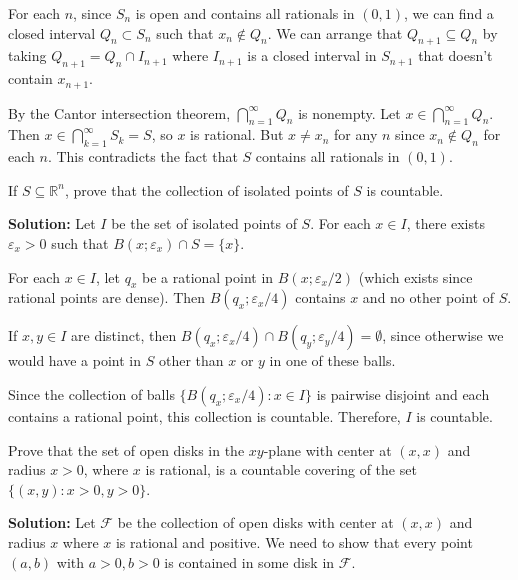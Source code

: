 For each $n$, since $S_n$ is open and contains all rationals in $(0,1)$, we can find a closed interval $Q_n \subset S_n$ such that $x_n \notin Q_n$. We can arrange that $Q_{n+1} \subseteq Q_n$ by taking $Q_{n+1} = Q_n \cap I_{n+1}$ where $I_{n+1}$ is a closed interval in $S_{n+1}$ that doesn't contain $x_{n+1}$.

By the Cantor intersection theorem, $\bigcap_{n=1}^{\infty} Q_n$ is nonempty. Let $x \in \bigcap_{n=1}^{\infty} Q_n$. Then $x \in \bigcap_{k=1}^{\infty} S_k = S$, so $x$ is rational. But $x \neq x_n$ for any $n$ since $x_n \notin Q_n$ for each $n$. This contradicts the fact that $S$ contains all rationals in $(0,1)$.

\begin{problembox}
If \( S \subseteq \mathbb{R}^n \), prove that the collection of isolated points of \( S \) is countable.
\end{problembox}

\textbf{Solution:} Let $I$ be the set of isolated points of $S$. For each $x \in I$, there exists $\varepsilon_x > 0$ such that $B(x;\varepsilon_x) \cap S = \{x\}$.

For each $x \in I$, let $q_x$ be a rational point in $B(x;\varepsilon_x/2)$ (which exists since rational points are dense). Then $B(q_x;\varepsilon_x/4)$ contains $x$ and no other point of $S$.

If $x, y \in I$ are distinct, then $B(q_x;\varepsilon_x/4) \cap B(q_y;\varepsilon_y/4) = \emptyset$, since otherwise we would have a point in $S$ other than $x$ or $y$ in one of these balls.

Since the collection of balls $\{B(q_x;\varepsilon_x/4) : x \in I\}$ is pairwise disjoint and each contains a rational point, this collection is countable. Therefore, $I$ is countable.

\begin{problembox}
Prove that the set of open disks in the \(xy\)-plane with center at \( (x, x) \) and radius \( x > 0 \), where \( x \) is rational, is a countable covering of the set \( \{(x, y) : x > 0, y > 0\} \).
\end{problembox}

\textbf{Solution:} Let $\mathcal{F}$ be the collection of open disks with center at $(x,x)$ and radius $x$ where $x$ is rational and positive. We need to show that every point $(a,b)$ with $a > 0, b > 0$ is contained in some disk in $\mathcal{F}$.

